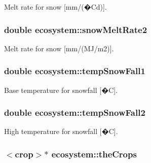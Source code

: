 Melt rate for snow \mbox{[}mm/(�Cd)\mbox{]}. \hypertarget{classecosystem_a5b694778f4af8dc19151098d90640fd8}{
\subsubsection[{snowMeltRate2}]{\setlength{\rightskip}{0pt plus 5cm}double {\bf ecosystem::snowMeltRate2}}}
\label{classecosystem_a5b694778f4af8dc19151098d90640fd8}


Melt rate for snow \mbox{[}mm/(MJ/m2)\mbox{]}. \hypertarget{classecosystem_a45ea3a5ece526455d6bc5942c90ac021}{
\subsubsection[{tempSnowFall1}]{\setlength{\rightskip}{0pt plus 5cm}double {\bf ecosystem::tempSnowFall1}}}
\label{classecosystem_a45ea3a5ece526455d6bc5942c90ac021}


Base temperature for snowfall \mbox{[}�C\mbox{]}. \hypertarget{classecosystem_aaad4a3984f8adec87aaac91fb8c153a1}{
\subsubsection[{tempSnowFall2}]{\setlength{\rightskip}{0pt plus 5cm}double {\bf ecosystem::tempSnowFall2}}}
\label{classecosystem_aaad4a3984f8adec87aaac91fb8c153a1}


High temperature for snowfall \mbox{[}�C\mbox{]}. \hypertarget{classecosystem_a5b32df2d08cd4a986e3e0773b858dfdf}{
\subsubsection[{theCrops}]{$<${\bf crop}$>$$\ast$ {\bf ecosystem::theCrops}}}
\label{classecosystem_a5b32df2d08cd4a986e3e0773b858dfdf}


